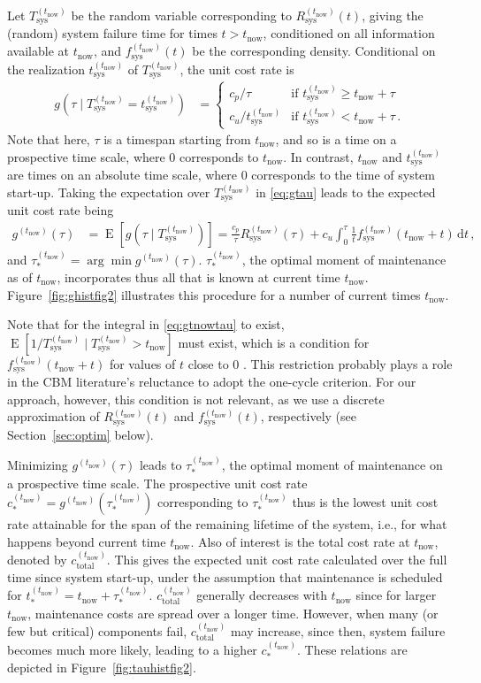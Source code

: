 \documentclass[authoryear]{elsarticle}
\newcommand{\dd}{\,\mathrm{d}}
\newcommand{\E}{\operatorname{E}}
\def\tnow{t_\text{now}}
\newcommand{\Rsysnow}{R^{(t_\text{now})}_\text{sys}}
\newcommand{\Tsysnow}{T^{(t_\text{now})}_\text{sys}}
\newcommand{\tsysnow}{t^{(t_\text{now})}_\text{sys}}
\newcommand{\fsysnow}{f^{(t_\text{now})}_\text{sys}}
\newcommand{\gnow}{g^{(\tnow)}}
\newcommand{\tausnow}{\tau_*^{(\tnow)}}
\newcommand{\tstarnow}{t_*^{(\tnow)}}
\newcommand{\cstarnow}{c_*^{(\tnow)}}
\newcommand{\ctotalnow}{c_\text{total}^{(\tnow)}}
\begin{document}
Let $\Tsysnow$ be the random variable corresponding to $\Rsysnow(t)$,
giving the (random) system failure time for times $t > \tnow$,
conditioned on all information available at $\tnow$,
and $\fsysnow(t)$ be the corresponding density.
Conditional on the realization $\tsysnow$ of $\Tsysnow$, the unit cost rate is 
\begin{align}
g(\tau \mid \Tsysnow = \tsysnow) &=
\begin{cases}
c_p / \tau     & \text{if } \tsysnow \ge \tnow + \tau \\
c_u / \tsysnow & \text{if } \tsysnow  <  \tnow + \tau \,.
\end{cases}
\label{eq:gtau}
\end{align}
Note that here, $\tau$ is a timespan starting from $\tnow$,
and so is a time on a prospective time scale, where $0$ corresponds to $\tnow$.
In contrast, $\tnow$ and $\tsysnow$ are times on an absolute time scale,
where $0$ corresponds to the time of system start-up.
Taking the expectation over $\Tsysnow$ in \eqref{eq:gtau} leads to the expected unit cost rate being
\begin{align}
\gnow(\tau) &= \E[g(\tau \mid \Tsysnow)] = \frac{c_p}{\tau} \Rsysnow(\tau) + c_u \int_0^\tau \frac{1}{t} \fsysnow(\tnow + t) \dd t\,,
\label{eq:gtnowtau}
\end{align}
and $\tausnow = \arg\min \gnow(\tau)$.
$\tausnow$, the optimal moment of maintenance as of $\tnow$,
incorporates thus all that is known at current time $\tnow$.
Figure~\ref{fig:ghistfig2} illustrates this procedure for a number of current times $\tnow$.

Note that for the integral in \eqref{eq:gtnowtau} to exist, $\E[1/\Tsysnow \mid \Tsysnow > \tnow]$ must exist,
which is a condition for $\fsysnow(\tnow + t)$ for values of $t$ close to $0$ \citep{2006:coolen-schrijner-coolen}.
This restriction probably plays a role in the CBM literature's reluctance to adopt the one-cycle criterion.
For our approach, however, this condition is not relevant,
as we use a discrete approximation of $\Rsysnow(t)$ and $\fsysnow(t)$, respectively
(see Section~\ref{sec:optim} below).

Minimizing $\gnow(\tau)$ leads to $\tausnow$,
the optimal moment of maintenance on a prospective time scale.
The prospective unit cost rate $\cstarnow = \gnow(\tausnow)$ corresponding to $\tausnow$
thus is the lowest unit cost rate attainable for the span of the remaining lifetime of the system,
i.e., for what happens beyond current time $\tnow$.
Also of interest is the total cost rate at $\tnow$, denoted by $\ctotalnow$.
This gives the expected unit cost rate calculated over the full time since system start-up,
under the assumption that maintenance is scheduled for $\tstarnow = \tnow + \tausnow$.
$\ctotalnow$ generally decreases with $\tnow$ since for larger $\tnow$, maintenance costs are spread over a longer time.
However, when many (or few but critical) components fail, $\ctotalnow$ may increase,
since then, system failure becomes much more likely, leading to a higher $\cstarnow$.
These relations are depicted in Figure~\ref{fig:tauhistfig2}. %
\end{document}
